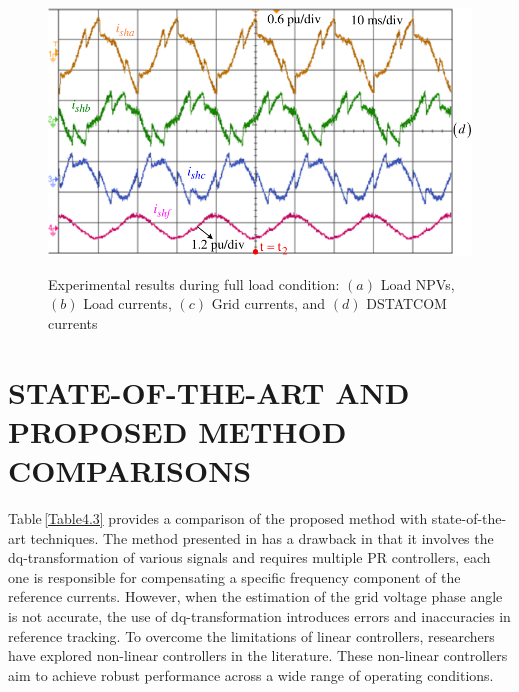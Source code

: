 \begin{figure}
		\label{4.sourcecurrent}
		\centering
		\includegraphics[scale=0.84]{figures/Chapter_4/Mine/FilterCurrents1.pdf}\\ 
		\label{4.filtercurrent}
	\caption{Experimental results during full load condition: $(a)$ Load NPVs, $(b)$ Load currents, $(c)$ Grid currents, and $(d)$ DSTATCOM currents}  \vspace*{-0.5cm}
	\label{fig4.71}
\end{figure}  
\section{STATE-OF-THE-ART AND PROPOSED METHOD COMPARISONS}

Table\,\ref{Table4.3} provides a comparison of the proposed method with state-of-the-art techniques. The method presented in \cite{6880399} has a drawback in that it involves the dq-transformation of various signals and requires multiple PR controllers, each one is responsible for compensating a specific frequency component of the reference currents. However, when the estimation of the grid voltage phase angle is not accurate, the use of dq-transformation introduces errors and inaccuracies in reference tracking. To overcome the limitations of linear controllers, researchers have explored non-linear controllers in the literature. These non-linear controllers aim to achieve robust performance across a wide range of operating conditions.

